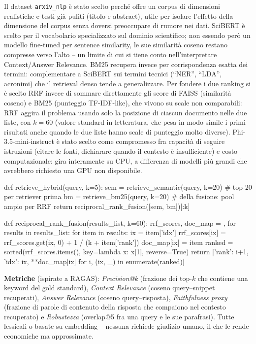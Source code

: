 \documentclass[12pt,a4paper]{article}
\begin{document}
Il dataset \texttt{arxiv\_nlp} \`e stato scelto perch\'e offre un corpus di dimensioni realistiche e testi gi\`a puliti (titolo e abstract), utile per isolare l'effetto della dimensione del corpus senza doversi preoccupare di rumore nei dati. SciBERT \`e scelto per il vocabolario specializzato sul dominio scientifico; non essendo per\`o un modello fine-tuned per sentence similarity, le sue similarit\`a coseno restano compresse verso l'alto -- un limite di cui si tiene conto nell'interpretare Context/Answer Relevance. BM25 recupera invece per corrispondenza esatta dei termini: complementare a SciBERT sui termini tecnici (``NER'', ``LDA'', acronimi) che il retrieval denso tende a generalizzare. Per fondere i due ranking si \`e scelto RRF invece di sommare direttamente gli score di FAISS (similarit\`a coseno) e BM25 (punteggio TF-IDF-like), che vivono su scale non comparabili: RRF aggira il problema usando solo la posizione di ciascun documento nelle due liste, con $k=60$ (valore standard in letteratura, che pesa in modo simile i primi risultati anche quando le due liste hanno scale di punteggio molto diverse). Phi-3.5-mini-instruct \`e stato scelto come compromesso fra capacit\`a di seguire istruzioni (citare le fonti, dichiarare quando il contesto \`e insufficiente) e costo computazionale: gira interamente su CPU, a differenza di modelli pi\`u grandi che avrebbero richiesto una GPU non disponibile.

\begin{pylisting}[title={Fusione ibrida: retrieval semantico + BM25 via RRF}]
def retrieve_hybrid(query, k=5):
    sem = retrieve_semantic(query, k=20)   # top-20 per retriever prima
    bm  = retrieve_bm25(query, k=20)       # della fusione: pool ampio per RRF
    return reciprocal_rank_fusion([sem, bm])[:k]

def reciprocal_rank_fusion(results_list, k=60):
    rrf_scores, doc_map = {}, {}
    for results in results_list:
        for item in results:
            ix = item['idx']
            rrf_scores[ix] = rrf_scores.get(ix, 0) + 1 / (k + item['rank'])
            doc_map[ix] = item
    ranked = sorted(rrf_scores.items(), key=lambda x: x[1], reverse=True)
    return [{'rank': i+1, 'idx': ix, **doc_map[ix]}
            for i, (ix, _) in enumerate(ranked)]
\end{pylisting}

\textbf{Metriche} (ispirate a RAGAS): \emph{Precision@k} (frazione dei top-$k$ che contiene una keyword del gold standard), \emph{Context Relevance} (coseno query--snippet recuperati), \emph{Answer Relevance} (coseno query--risposta), \emph{Faithfulness proxy} (frazione di parole di contenuto della risposta che compaiono nel contesto recuperato) e \emph{Robustezza} (overlap@5 fra una query e le sue parafrasi). Tutte lessicali o basate su embedding -- nessuna richiede giudizio umano, il che le rende economiche ma approssimate.
\end{document}
